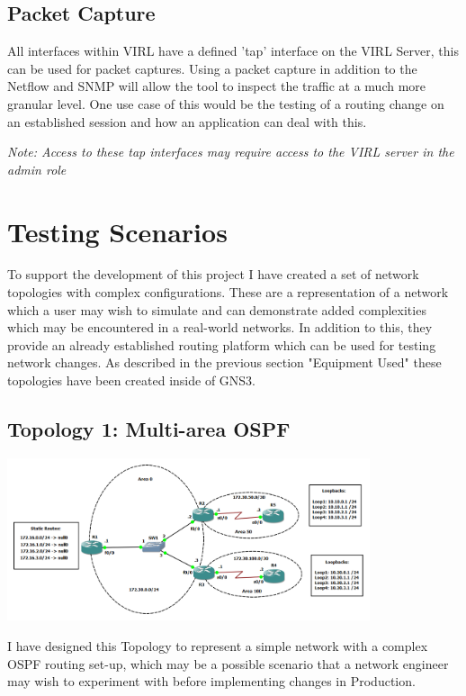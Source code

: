 \documentclass[11pt]{report}
\begin{document}
\subsection{Packet Capture}

All interfaces within VIRL have a defined 'tap' interface on the VIRL Server, this can be used for packet captures. Using a packet capture in addition to the Netflow and SNMP will allow the tool to inspect the traffic at a much more granular level. One use case of this would be the testing of a routing change on an established session and how an application can deal with this.

\textit{Note: Access to these tap interfaces may require access to the VIRL server in the admin role}
 

\section{Testing Scenarios}

To support the development of this project I have created a set of network topologies with complex configurations. These are a representation of a network which a user may wish to simulate and can demonstrate added complexities which may be encountered in a real-world networks. In addition to this, they provide an already established routing platform which can be used for testing network changes. As described in the previous section "Equipment Used" these topologies have been created inside of GNS3.

\subsection{Topology 1: Multi-area OSPF}

\begin{center}
\includegraphics[width=0.8\textwidth]{OSPF-Topology.png}
\end{center}

I have designed this Topology to represent a simple network with a complex OSPF routing set-up, which may be a possible scenario that a network engineer may wish to experiment with before implementing changes in Production.
\end{document}
